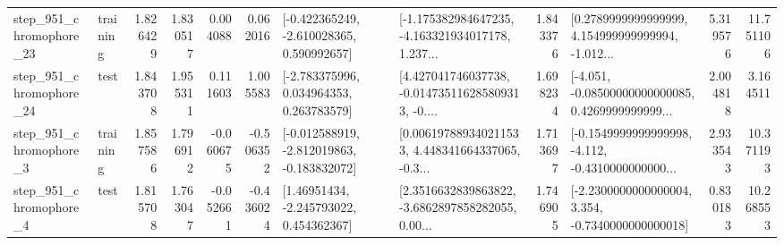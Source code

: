 \begin{tabular}{llrrrrllrlrr}
  step\_951\_chromophore\_23 &  training &      1.826429 &    1.830517 &      0.004088 &  0.062016 &   [-0.422365249, -2.610028365, 0.590992657] &  [-1.175382984647235, -4.163321934017178, 1.237... &       1.843376 &  [0.2789999999999999, 4.154999999999994, -1.012... &            5.319576 &         11.751106 \\
  step\_951\_chromophore\_24 &      test &      1.843708 &    1.955311 &      0.111603 &  1.005583 &    [-2.783375996, 0.034964353, 0.263783579] &  [4.427041746037738, -0.014735116285809313, -0.... &       1.698234 &  [-4.051, -0.08500000000000085, 0.4269999999999... &            2.004818 &          3.164511 \\
   step\_951\_chromophore\_3 &  training &      1.857586 &    1.796912 &     -0.060675 & -0.506352 &  [-0.012588919, -2.812019863, -0.183832072] &  [0.006197889340211533, 4.448341664337065, -0.3... &       1.713697 &  [-0.1549999999999998, -4.112, -0.4310000000000... &            2.933543 &         10.371193 \\
   step\_951\_chromophore\_4 &      test &      1.815708 &    1.763047 &     -0.052661 & -0.436024 &     [1.46951434, -2.245793022, 0.454362367] &  [2.3516632839863822, -3.6862897858282055, 0.00... &       1.746905 &  [-2.2300000000000004, 3.354, -0.7340000000000018] &            0.830183 &         10.268553 \\
\bottomrule
\end{tabular}

